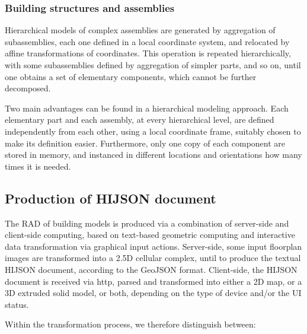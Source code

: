 \documentclass[]{egpubl}
\begin{document}
\subsubsection*{Building structures and assemblies}

Hierarchical models of complex assemblies are generated by aggregation
of subassemblies, each one defined in a local coordinate system, and
relocated by affine transformations of coordinates.  This operation
is repeated hierarchically, with some subassemblies defined by
aggregation of simpler parts, and so on, until one obtains a set of
elementary components, which cannot be further decomposed.

Two main advantages can be found in a hierarchical modeling approach. Each elementary part and each assembly, at every hierarchical level, are defined independently from each other, using a local coordinate frame, suitably chosen to make its definition easier. Furthermore, only one copy of each component are stored in memory, and instanced in different locations and orientations how many times it is needed.


\subsection{Production of HIJSON document}

The RAD of building models is produced via a combination of server-side and client-side computing,
based on text-based geometric computing and interactive data 
transformation via graphical input actions. Server-side, some input floorplan images are transformed into a 2.5D cellular complex, until to produce the textual HIJSON document, according to the GeoJSON format.
Client-side, the HIJSON document is received via http, parsed and transformed into either a 2D map, or a 3D extruded solid model, or both, depending on the type of device and/or the UI status.

Within the transformation process, we therefore distinguish between:
\end{document}
